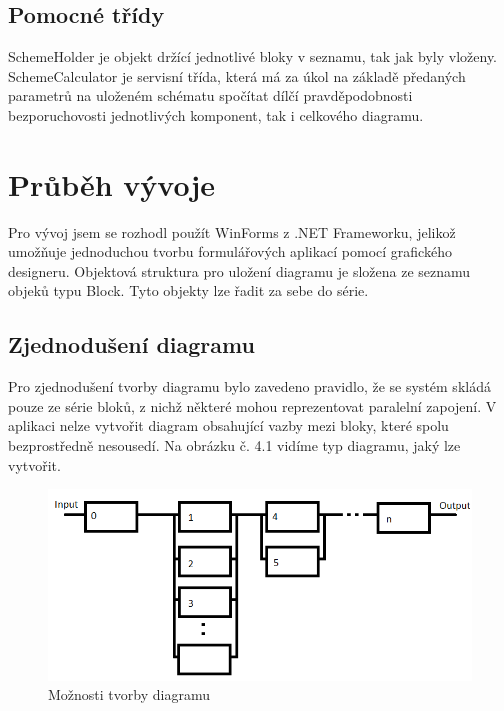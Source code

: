 \documentclass[FM,RP]{tulthesis}
\begin{document}
    \section*{Pomocné třídy}
        SchemeHolder je objekt držící jednotlivé bloky v seznamu, tak jak byly vloženy. 
        SchemeCalculator je servisní třída, která má za úkol na základě předaných parametrů na uloženém schématu spočítat dílčí pravděpodobnosti bezporuchovosti jednotlivých komponent,
         tak i celkového diagramu.

\chapter{Průběh vývoje}
    Pro vývoj jsem se rozhodl použít WinForms z .NET Frameworku, jelikož umožňuje jednoduchou tvorbu formulářových aplikací pomocí grafického designeru.
    Objektová struktura pro uložení diagramu je složena ze seznamu objeků typu Block. Tyto objekty lze řadit za sebe do série.

    \section*{Zjednodušení diagramu}
        Pro zjednodušení tvorby diagramu bylo zavedeno pravidlo, že se systém skládá pouze ze série bloků, z nichž některé mohou reprezentovat paralelní zapojení.
        V aplikaci nelze vytvořit diagram obsahující vazby mezi bloky, které spolu bezprostředně nesousedí. Na obrázku č. 4.1 vidíme typ diagramu, jaký lze vytvořit.
        \begin{figure}[h]
          \centering
           \includegraphics[scale=0.55]{pic/moznosti.png}
           \caption{Možnosti tvorby diagramu} 
        \end{figure}
\end{document}
